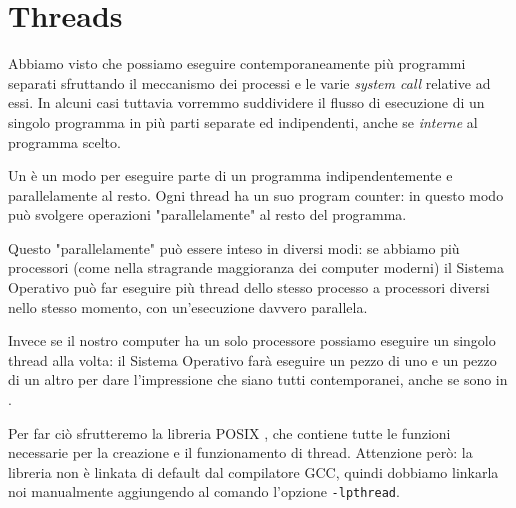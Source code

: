 \section{Threads}

Abbiamo visto che possiamo eseguire contemporaneamente più programmi separati sfruttando il meccanismo dei processi e le varie \emph{system call} relative ad essi. In alcuni casi tuttavia vorremmo suddividere il flusso di esecuzione di un singolo programma in più parti separate ed indipendenti, anche se \emph{interne} al programma scelto.

Un  è un modo per eseguire parte di un programma indipendentemente e parallelamente al resto. Ogni thread ha un suo program counter: in questo modo può svolgere operazioni "parallelamente" al resto del programma. 

Questo "parallelamente" può essere inteso in diversi modi: se abbiamo più processori (come nella stragrande maggioranza dei computer moderni) il Sistema Operativo può far eseguire più thread dello stesso processo a processori diversi nello stesso momento, con un'esecuzione davvero parallela.

Invece se il nostro computer ha un solo processore possiamo eseguire un singolo thread alla volta: il Sistema Operativo farà eseguire un pezzo di uno e un pezzo di un altro per dare l'impressione che siano tutti contemporanei, anche se sono in .

Per far ciò sfrutteremo la libreria POSIX , che contiene tutte le funzioni necessarie per la creazione e il funzionamento di thread. Attenzione però: la libreria  non è linkata di default dal compilatore GCC, quindi dobbiamo linkarla noi manualmente aggiungendo al comando l'opzione \texttt{-lpthread}.